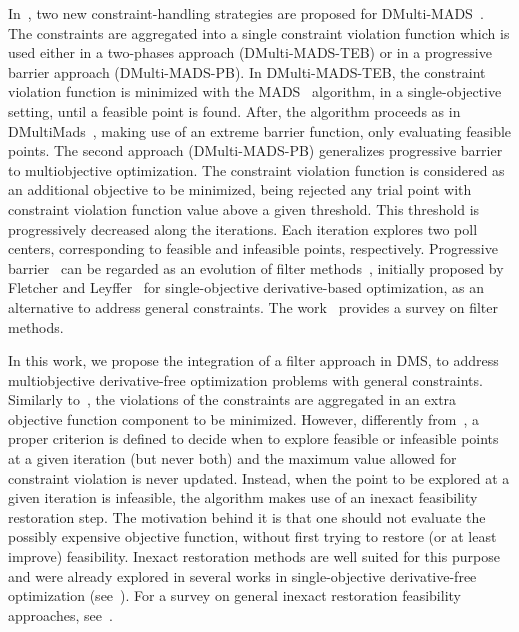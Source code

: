 \documentclass[12pt]{article}
\begin{document}
In~\cite{bigeon2022}, two new constraint-handling strategies are
proposed for DMulti-MADS~\cite{bigeon2020}. The constraints are
aggregated into a single constraint violation function which is
used either in a two-phases approach (DMulti-MADS-TEB) or in a
progressive barrier approach (DMulti-MADS-PB). In DMulti-MADS-TEB,
the constraint violation function is minimized with the
MADS~\cite{audet2006} algorithm, in a single-objective setting,
until a feasible point is found. After, the algorithm proceeds as
in DMultiMads~\cite{bigeon2020}, making use of an extreme barrier
function, only evaluating feasible points. The second approach
(DMulti-MADS-PB) generalizes progressive
barrier~\cite{CAudet_JEDennis_2009} to multiobjective
optimization. The constraint violation function is considered as
an additional objective to be minimized, being rejected any trial
point with constraint violation function value above a given
threshold. This threshold is progressively decreased along the
iterations. Each iteration explores two poll centers,
corresponding to feasible and infeasible points, respectively.
Progressive barrier~\cite{CAudet_JEDennis_2009} can be regarded as
an evolution of filter methods~\cite{audet2004}, initially
proposed by Fletcher and Leyffer~\cite{fletcher2002} for
single-objective derivative-based optimization, as an alternative
to address general constraints. The work~\cite{fletcher2007}
provides a survey on filter methods.

In this work, we propose the integration of a filter approach in
DMS, to address multiobjective derivative-free optimization
problems with general constraints. Similarly to~\cite{bigeon2022},
the violations of the constraints are aggregated in an extra
objective function component to be minimized. However, differently
from~\cite{bigeon2022}, a proper criterion is defined to decide
when to explore feasible or infeasible points at a given iteration
(but never both) and the maximum value allowed for constraint
violation is never updated. Instead, when the point to be explored
at a given iteration is infeasible, the algorithm makes use of an
inexact feasibility restoration step. The motivation behind it is
that one should not evaluate the possibly expensive objective
function, without first trying to restore (or at least improve)
feasibility. Inexact restoration methods are well suited for this
purpose and were already explored in several works in
single-objective derivative-free optimization
(see~\cite{pilotta2015,Birgin2022,LFBueno_et_al_2013,Echebest2017,Ferreira2017,martinez_sobral2013}).
For a survey on general inexact restoration feasibility
approaches, see~\cite{pillota2005}.
\end{document}
